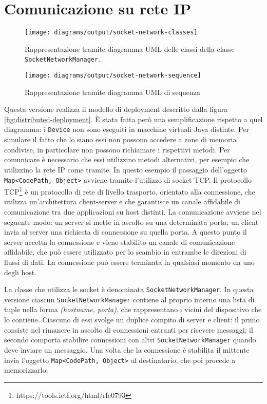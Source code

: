 \section{Comunicazione su rete IP}
\begin{figure}
  \centering
  \texttt{[image: diagrams/output/socket-network-classes]}
  \caption{Rappresentazione tramite diagramma UML delle classi della classe
    \texttt{SocketNetworkManager}.}
  \label{fig:socket-network-classes}
\end{figure}
\begin{figure}
  \centering
  \texttt{[image: diagrams/output/socket-network-sequence]}
  \caption{Rappresentazione tramite diagramma UML di sequenza}
  \label{fig:socket-network-sequence}
\end{figure}
Questa versione realizza il modello di deployment descritto dalla figura
\ref{fig:distributed-deployment}. È stata fatta però una semplificazione
rispetto a quel diagramma: i \texttt{Device} non sono eseguiti in macchine
virtuali Java distinte. Per simulare il fatto che lo siano essi non possono
accedere a zone di memoria condivise, in particolare non possono richiamare i
rispettivi metodi. Per comunicare è necessario che essi utilizzino metodi
alternativi, per esempio che utilizzino la rete IP come tramite. In questo
esempio il passaggio dell'oggetto \texttt{Map<CodePath, Object>} avviene tramite
l'utilizzo di socket TCP. Il protocollo
TCP\footnote{https://tools.ietf.org/html/rfc0793} è un protocollo di rete di
livello trasporto, orientato alla connessione, che utilizza un'architettura
client-server e che garantisce un canale affidabile di comunicazione tra due
applicazioni su host distinti. La comunicazione avviene nel seguente modo: un
server si mette in ascolto su una determinata porta; un client invia al server
una richiesta di connessione su quella porta. A questo punto il server accetta
la connessione e viene stabilito un canale di comunicazione affidabile, che può
essere utilizzato per lo scambio in entrambe le direzioni di flussi di dati. La
connessione può essere terminata in qualsiasi momento da uno degli host.

La classe che utilizza le socket è denominata \texttt{SocketNetworkManager}. In
questa versione ciascun \texttt{SocketNetworkManager} contiene al proprio
interno una lista di tuple nella forma \textit{(hostname, porta)}, che
rappresentano i vicini del dispositivo che lo contiene. Ciascuno di essi svolge
un duplice compito di server e client: il primo consiste nel rimanere in ascolto
di connessioni entranti per ricevere messaggi; il secondo comporta stabilire
connessioni con altri \texttt{SocketNetworkManager} quando deve inviare un
messaggio. Una volta che la connessione è stabilita il mittente invia l'oggetto
\texttt{Map<CodePath, Object>} al destinatario, che poi procede a memorizzarlo.

